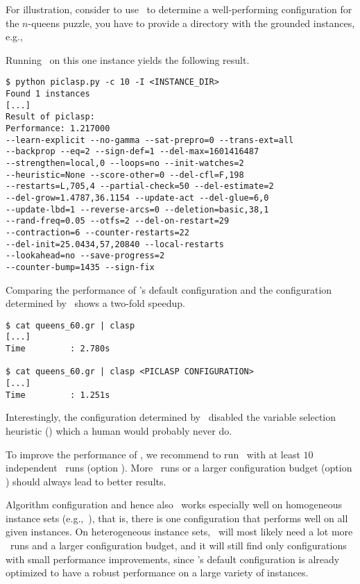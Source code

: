 \begin{example}
For illustration, consider to use \piclasp\ to determine a well-performing configuration for the $n$-queens puzzle, 
you have to provide a directory with the grounded instances, e.g., 

Running \piclasp\ on this one instance yields the following result.
\begin{lstlisting}[numbers=none]
$ python piclasp.py -c 10 -I <INSTANCE_DIR>
Found 1 instances
[...]
Result of piclasp:
Performance: 1.217000
--learn-explicit --no-gamma --sat-prepro=0 --trans-ext=all
--backprop --eq=2 --sign-def=1 --del-max=1601416487
--strengthen=local,0 --loops=no --init-watches=2
--heuristic=None --score-other=0 --del-cfl=F,198
--restarts=L,705,4 --partial-check=50 --del-estimate=2
--del-grow=1.4787,36.1154 --update-act --del-glue=6,0
--update-lbd=1 --reverse-arcs=0 --deletion=basic,38,1
--rand-freq=0.05 --otfs=2 --del-on-restart=29 
--contraction=6 --counter-restarts=22 
--del-init=25.0434,57,20840 --local-restarts 
--lookahead=no --save-progress=2
--counter-bump=1435 --sign-fix
\end{lstlisting}

Comparing the performance of \clasp's default configuration
and the configuration determined by \piclasp\ shows a two-fold speedup.

\begin{lstlisting}[numbers=none]
$ cat queens_60.gr | clasp
[...]
Time         : 2.780s

$ cat queens_60.gr | clasp <PICLASP CONFIGURATION>
[...]
Time         : 1.251s
\end{lstlisting}

Interestingly, the configuration determined by \piclasp\ disabled the variable selection heuristic ()
which a human would probably never do.

\end{example}

\begin{note}
To improve the performance of \piclasp, 
we recommend to run \piclasp\ with at least $10$ independent \smac\ runs (option ).
More \smac\ runs or a larger configuration budget (option ) should always lead to better results.   
\end{note}

\begin{note}
Algorithm configuration and hence also \piclasp\ works especially well on homogeneous instance sets (e.g.,~\cite{gejokaobsascsc13a}),
that is, there is one configuration that performs well on all given instances.
On heterogeneous instance sets, \piclasp\ will most likely need a lot more \smac\ runs and a larger configuration budget,
and it will still find only configurations with small performance improvements, 
since \clasp's default configuration is already optimized to have a robust performance on a large variety of instances.
\end{note}

